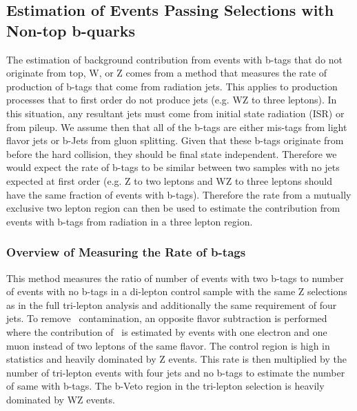 	\subsection{Estimation of Events Passing Selections with Non-top b-quarks}
	\label{sec:brate_estimation}
	The estimation of background contribution from events with b-tags that do not originate from top, W, or Z  comes from a method that measures the rate of production of b-tags that come from radiation jets. This applies to production processes that to first order do not produce jets (e.g. WZ to three leptons). In this situation, any resultant jets must come from initial state radiation (ISR) or from pileup. We assume then that all of the b-tags are either mis-tags from light flavor jets or b-Jets from gluon splitting. Given that these b-tags originate from before the hard collision, they should be final state independent. Therefore we would expect the rate of b-tags to be similar between two samples with no jets expected at first order (e.g. Z to two leptons and WZ to three leptons should have the same fraction of events with b-tags). Therefore the rate from a mutually exclusive two lepton region can then be used to estimate the contribution from events with b-tags from radiation in a three lepton region.
	
		
        		\subsubsection{Overview of Measuring the Rate of b-tags}
		This method measures the ratio of number of events with two b-tags to number of events with no b-tags in a di-lepton control sample with the same Z selections as in the full tri-lepton analysis and additionally the same requirement of four jets. To remove \ttbar \ contamination, an opposite flavor subtraction is performed where the contribution of \ttbar \ is estimated by events with one electron and one muon instead of two leptons of the same flavor. The control region is high in statistics and heavily dominated by Z events.  This rate is then multiplied by the number of tri-lepton events with four jets and no b-tags to estimate the number of same with b-tags. The b-Veto region in the tri-lepton selection is heavily dominated by WZ events.\\

